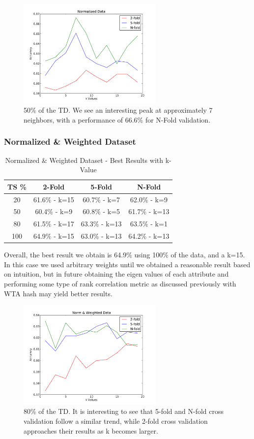 \documentclass[conference]{acmsiggraph}
\begin{document}
\begin{figure}[h]
  \centering
  \includegraphics[width=2.8in]{images/alc_n_50.pdf}
  \caption{50\% of the TD. We see an interesting peak at approximately 7 neighbors, with a performance of 66.6\% for N-Fold validation.}
\end{figure}


\subsubsection{Normalized \& Weighted Dataset}
\begin{table}[h]
\caption{Normalized \& Weighted Dataset - Best Results with k-Value}
\centering
\begin{tabular}{c c c c}
\hline\hline
TS \% & 2-Fold & 5-Fold & N-Fold \\ [0.5ex]
\hline
20 & 61.6\% - k=15 & 60.7\% - k=7 & 62.0\% - k=9 \\
50 & 60.4\% - k=9 & 60.8\% - k=5 & 61.7\% - k=13 \\
80 & 61.5\% - k=17 & 63.3\% - k=13 & 63.5\% - k=1 \\
100 & 64.9\% - k=15 & 63.0\% - k=13 & 64.2\% - k=13 \\
\hline
\end{tabular}
\label{alc_nw_res_table}
\end{table}

Overall, the best result we obtain is 64.9\% using 100\% of the data, and a k=15. In this case we used arbitrary weights until we obtained a reasonable result based on intuition, but in future obtaining the eigen values of each attribute and performing some type of rank correlation metric as discussed previously with WTA hash may yield better results.

\begin{figure}[h]
  \centering
  \includegraphics[width=2.8in]{images/alc_nw_80.pdf}
  \caption{80\% of the TD. It is interesting to see that 5-fold and N-fold cross validation follow a similar trend, while 2-fold cross validation approaches their results as k becomes larger.}
\end{figure}
\end{document}
